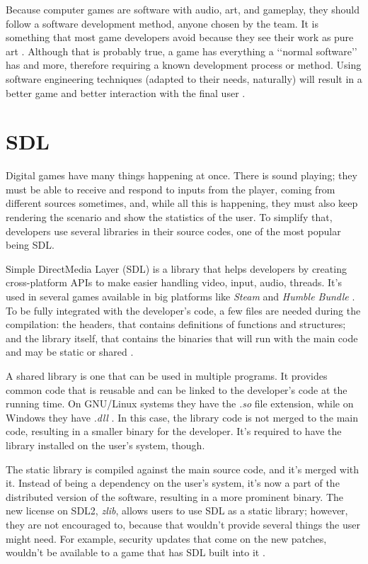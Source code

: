 Because computer games are software with audio, art, and gameplay, they should follow a software development method, anyone chosen by the team. It is something that most game developers avoid because they see their work as pure art \cite{bethke2003game}. Although that is probably true, a game has everything a \lq\lq normal software\rq\rq{} has and more, therefore requiring a known development process or method. Using software engineering techniques (adapted to their needs, naturally) will result in a better game and better interaction with the final user \cite{pressman2009software}.


\section{SDL}
\label {sec:sdl}

Digital games have many things happening at once. There is sound playing; they must be able to receive and respond to inputs from the player, coming from different sources sometimes, and, while all this is happening, they must also keep rendering the scenario and show the statistics of the user. To simplify that, developers use several libraries in their source codes, one of the most popular being SDL.

Simple DirectMedia Layer (SDL) is a library that helps developers by creating cross-platform APIs to make easier handling video, input, audio, threads. It's used in several games available in big platforms like \textit{Steam} and \textit{Humble Bundle} \cite{sdl2017}. To be fully integrated with the developer's code, a few files are needed during the compilation: the headers, that contains definitions of functions and structures; and the library itself, that contains the binaries that will run with the main code and may be static or shared \cite{mitchell2013sdl}.

A shared library is one that can be used in multiple programs. It provides common code that is reusable and can be linked to the developer's code at the running time. On GNU/Linux systems they have the \textit{.so} file extension, while on Windows they have \textit{.dll} \cite{campbell2009algorithms}. In this case, the library code is not merged to the main code, resulting in a smaller binary for the developer. It's required to have the library installed on the user's system, though.

The static library is compiled against the main source code, and it's merged with it. Instead of being a dependency on the user's system, it's now a part of the distributed version of the software, resulting in a more prominent binary. The new license on SDL2, \textit{zlib}\footnotemark, allows users to use SDL as a static library; however, they are not encouraged to, because that wouldn't provide several things the user might need. For example, security updates that come on the new patches, wouldn't be available to a game that has SDL built into it \cite{ryangordon2017}.


